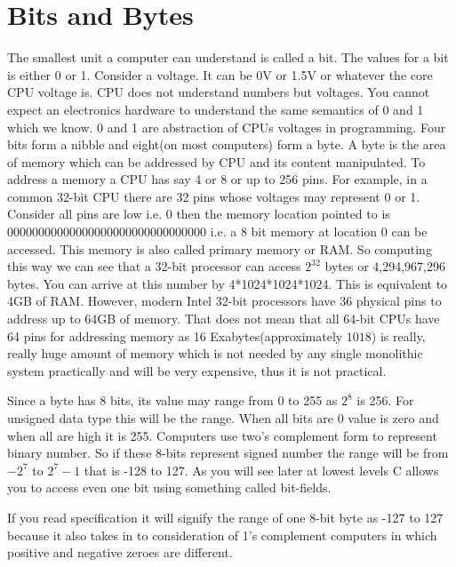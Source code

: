 \section{Bits and Bytes}
The smallest unit a computer can understand is called a bit. The values for a
bit is either 0 or 1. Consider a voltage. It can be 0V or 1.5V or whatever the
core CPU voltage is. CPU does not understand numbers but voltages. You
cannot expect an electronics hardware to understand the same semantics of 0 and
1 which we know. 0 and 1 are abstraction of CPUs voltages in programming. Four
bits form a nibble and eight(on most computers) form a byte. A byte is the area
of memory which can be addressed by CPU and its content manipulated. To address
a memory a CPU has say 4 or 8 or up to 256 pins. For example, in a common
32-bit CPU there are 32 pins whose voltages may represent 0 or 1. Consider all
pins are low i.e. 0 then the memory location pointed to is
00000000000000000000000000000000 i.e. a 8 bit memory at location 0 can be
accessed. This memory is also called primary memory or RAM. So computing this
way we can see that a 32-bit processor can access 
$2^{32}$ bytes or 4,294,967,296 bytes. You can arrive at 
this number by 4*1024*1024*1024. This is equivalent to 4GB of RAM. However,
modern Intel 32-bit processors have 36 physical pins to address up to 64GB of
memory. That does not mean that all 64-bit CPUs have 64 pins for addressing
memory as 16 Exabytes(approximately $10{18}$) is really, really huge amount of
memory which is not needed by any single monolithic system practically and will
be very expensive, thus it is not practical.

Since a byte has 8 bits, its value may range from 0 to 255 as $2^8$ is 256. For
unsigned data type this will be the range. When all bits are 0 value is zero
and when all are high it is 255. Computers use two’s complement form to
represent binary number. So if these 8-bits represent signed number the range
will be from $−2^7$ to $2^7−1$ that is -128 to 127. As you will see later at lowest
levels C allows you to access even one bit using something called bit-fields.

If you read specification it will signify the range of one 8-bit byte as -127
to 127 because it also takes in to consideration of 1's complement computers in
which positive and negative zeroes are different.


